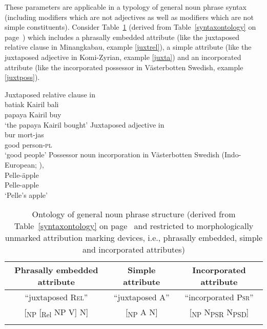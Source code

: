 These parameters are applicable in a typology of general noun phrase syntax (including modifiers which are not adjectives as well as modifiers which are not simple constituents). Consider Table~\ref{ontologyderived} (derived from Table~\ref{syntaxontology} on page~\pageref{syntaxontology}) which includes a phrasally embedded attribute (like the juxtaposed relative clause in Minangkabau, example \ref{juxtrel}), a simple attribute (like the juxtaposed adjective in Komi-Zyrian, example \ref{juxta}) and an incorporated attribute (like the incorporated possessor in Västerbotten Swedish, example \ref{juxtposs}).
\begin{exe}
\ex
\begin{xlist}
\ex
\label{juxtrel}
{\rm Juxtaposed relative clause in }\\
\gll batiak Kairil bali\\
	papaya Kairil buy\\
\glt	‘the papaya Kairil bought’
\ex
\label{juxta}
{\rm Juxtaposed adjective in }\\
\gll		bur	mort-jas\\
		good	person-\textsc{pl}\\
\glt		‘good people’
\ex
\label{juxtposs}
{\rm Possessor noun incorporation in Västerbotten Swedish (Indo-European; \citealt[examples from][3–4]{gil2005})}‚\\
\gll	Pelle-äpple\\
	Pelle-apple\\
\glt	‘Pelle's apple’
\end{xlist}
\end{exe}
\begin{table}
\begin{tabular}{c c c}
\lsptoprule
Phrasally embedded	attribute		&Simple	attribute				&Incorporated attribute\\
\midrule
“juxtaposed \textsc{Rel}”		&“juxtaposed \textsc{A}”		&“incorporated \textsc{Psr}”\\
\midrule
{[}\textsubscript{NP} [\textsubscript{Rel} NP V] N]	&[\textsubscript{NP} A N]			&[\textsubscript{NP} N\textsubscript{PSR} N\textsubscript{PSD}]\\
\lspbottomrule
\end{tabular}
\caption[Ontology of general noun phrase structure]{Ontology of general noun phrase structure (derived from Table~\ref{syntaxontology} on page~\pageref{syntaxontology} and restricted to morphologically unmarked attribution marking devices, i.e., phrasally embedded, simple and incorporated attributes)}\label{ontologyderived}
\end{table}

